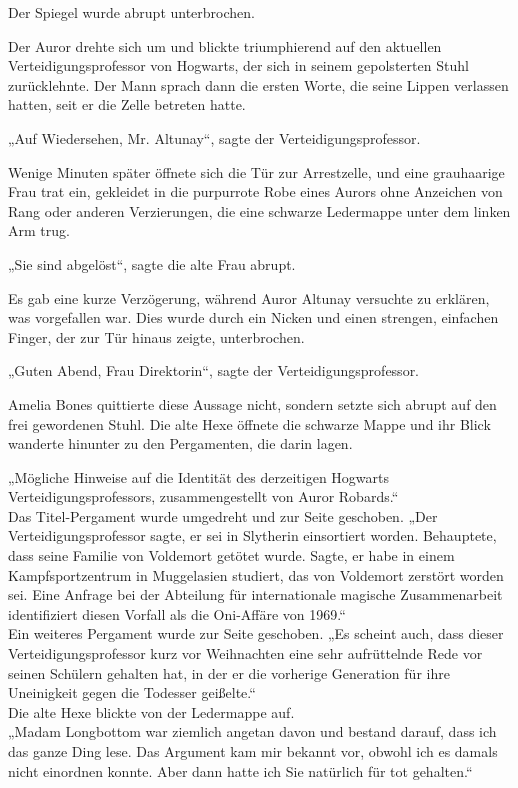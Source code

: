 {Der Spiegel wurde abrupt unterbrochen.

Der Auror drehte sich um und blickte triumphierend auf den aktuellen Verteidigungsprofessor von Hogwarts, der sich in seinem gepolsterten Stuhl zurücklehnte. Der Mann sprach dann die ersten Worte, die seine Lippen verlassen hatten, seit er die Zelle betreten hatte.

„Auf Wiedersehen, Mr. Altunay“, sagte der Verteidigungsprofessor.

Wenige Minuten später öffnete sich die Tür zur Arrestzelle, und eine grauhaarige Frau trat ein, gekleidet in die purpurrote Robe eines Aurors ohne Anzeichen von Rang oder anderen Verzierungen, die eine schwarze Ledermappe unter dem linken Arm trug.

„Sie sind abgelöst“, sagte die alte Frau abrupt.

Es gab eine kurze Verzögerung, während Auror Altunay versuchte zu erklären, was vorgefallen war. Dies wurde durch ein Nicken und einen strengen, einfachen Finger, der zur Tür hinaus zeigte, unterbrochen.

„Guten Abend, Frau Direktorin“, sagte der Verteidigungsprofessor.

Amelia Bones quittierte diese Aussage nicht, sondern setzte sich abrupt auf den frei gewordenen Stuhl. Die alte Hexe öffnete die schwarze Mappe und ihr Blick wanderte hinunter zu den Pergamenten, die darin lagen.

„Mögliche Hinweise auf die Identität des derzeitigen Hogwarts Verteidigungsprofessors, zusammengestellt von Auror Robards.“\\ Das Titel-Pergament wurde umgedreht und zur Seite geschoben. „Der Verteidigungsprofessor sagte, er sei in Slytherin einsortiert worden. Behauptete, dass seine Familie von Voldemort getötet wurde. Sagte, er habe in einem Kampfsportzentrum in Muggelasien studiert, das von Voldemort zerstört worden sei. Eine Anfrage bei der Abteilung für internationale magische Zusammenarbeit identifiziert diesen Vorfall als die Oni-Affäre von 1969.“\\ Ein weiteres Pergament wurde zur Seite geschoben. „Es scheint auch, dass dieser Verteidigungsprofessor kurz vor Weihnachten eine sehr aufrüttelnde Rede vor seinen Schülern gehalten hat, in der er die vorherige Generation für ihre Uneinigkeit gegen die Todesser geißelte.“\\ Die alte Hexe blickte von der Ledermappe auf.\\ „Madam Longbottom war ziemlich angetan davon und bestand darauf, dass ich das ganze Ding lese. Das Argument kam mir bekannt vor, obwohl ich es damals nicht einordnen konnte. Aber dann hatte ich Sie natürlich für tot gehalten.“

}
